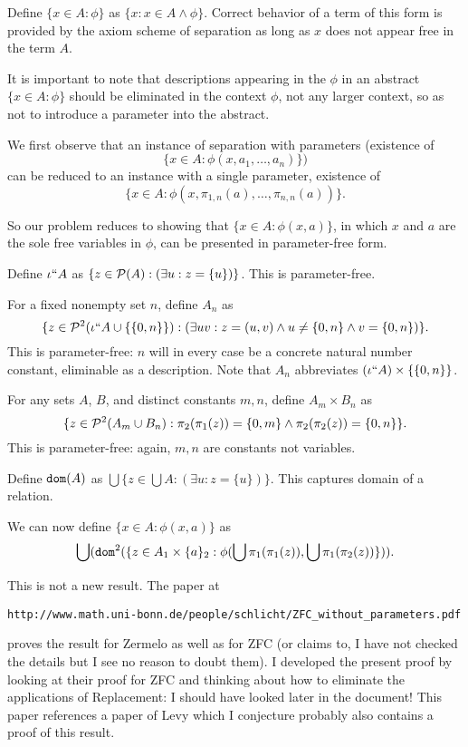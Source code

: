 \documentclass[12pt]{article}
\begin{document}
Define $\{x \in A:\phi\}$ as $\{x:x \in A \wedge \phi\}$.  Correct behavior of a term of this form is provided by the axiom scheme of separation
as long as $x$ does not appear free in the term $A$.

It is important to note that descriptions appearing in the $\phi$ in an abstract $\{x \in A:\phi\}$ should be eliminated in the context $\phi$, not any larger context, so as not to introduce a parameter into the abstract.

We first observe that an instance of separation with parameters (existence of $$\{x \in A:\phi(x,a_1,\ldots,a_n)\})$$ can be reduced to an instance with a single parameter, existence of 
$$\{x \in A:\phi(x,\pi_{1,n}(a),\ldots,\pi_{n,n}(a))\}.$$



So our problem reduces to showing that $\{x \in A:\phi(x,a)\}$, in which $x$ and $a$ are the sole free variables in $\phi$, can be presented
in parameter-free form.

Define $\iota``A$ as $\{z \in {\cal P}(A):(\exists u:z=\{u\})\}$.  This is parameter-free.

For a fixed nonempty set $n$, define $A_n$ as $$\{z \in {\cal P}^2(\iota``A \cup \{\{0,n\}\}):(\exists uv:z=(u,v) \wedge u \neq \{0,n\} \wedge v = \{0,n\})\}.$$  This is parameter-free:  $n$ will in every case be a concrete natural number constant, eliminable as a description.  Note that $A_n$
abbreviates $(\iota``A) \times \{\{0,n\}\}$.

For any sets $A$, $B$, and distinct constants $m,n$, define $A_m \times B_n$ as  $$\{z \in {\cal P}^2(A_m \cup B_n):\pi_2(\pi_1(z)) = \{0,m\} \wedge \pi_2(\pi_2(z)) = \{0,n\}\}.$$  This is parameter-free:  again, $m,n$ are constants not variables.

Define ${\tt dom}(A)$ as $\bigcup \{z \in \bigcup A:(\exists u:z=\{u\})\}$.  This captures domain of a relation.

We can now define $\{x \in A:\phi(x,a)\}$ as $$\bigcup({\tt dom}^2(\{z \in A_1 \times \{a\}_2:\phi(\bigcup \pi_1(\pi_1(z)),\bigcup \pi_1(\pi_2(z))\})).$$


This is not a new result.  The paper at 

{\tt http://www.math.uni-bonn.de/people/schlicht/ZFC\_without\_parameters.pdf}

proves the result for Zermelo as well as for ZFC (or claims to, I have not checked the details but I see no reason to doubt them).  I developed
the present proof by looking at their proof for ZFC and thinking about how to eliminate the applications of Replacement:  I should have looked later in the document!  This paper references a paper of Levy which I conjecture probably also contains a proof of this result.
\end{document}
